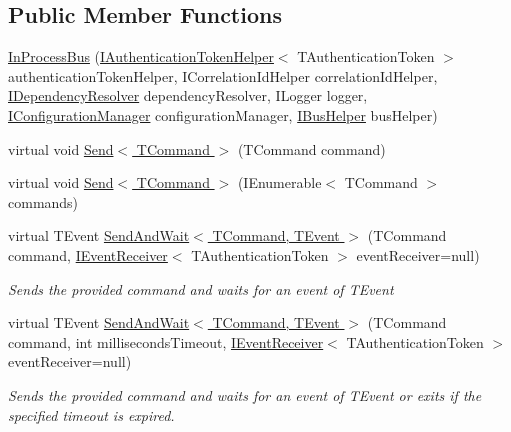 \subsection*{Public Member Functions}
\begin{DoxyCompactItemize}
\item 
\hyperlink{classCqrs_1_1Bus_1_1InProcessBus_a64bea583461562783d97cd98ff0dff91_a64bea583461562783d97cd98ff0dff91}{In\+Process\+Bus} (\hyperlink{interfaceCqrs_1_1Authentication_1_1IAuthenticationTokenHelper}{I\+Authentication\+Token\+Helper}$<$ T\+Authentication\+Token $>$ authentication\+Token\+Helper, I\+Correlation\+Id\+Helper correlation\+Id\+Helper, \hyperlink{interfaceCqrs_1_1Configuration_1_1IDependencyResolver}{I\+Dependency\+Resolver} dependency\+Resolver, I\+Logger logger, \hyperlink{interfaceCqrs_1_1Configuration_1_1IConfigurationManager}{I\+Configuration\+Manager} configuration\+Manager, \hyperlink{interfaceCqrs_1_1Bus_1_1IBusHelper}{I\+Bus\+Helper} bus\+Helper)
\item 
virtual void \hyperlink{classCqrs_1_1Bus_1_1InProcessBus_a6a074ef3663d2855875307b106fe4416_a6a074ef3663d2855875307b106fe4416}{Send$<$ T\+Command $>$} (T\+Command command)
\item 
virtual void \hyperlink{classCqrs_1_1Bus_1_1InProcessBus_ae5dae5f2445387280c974ec181167055_ae5dae5f2445387280c974ec181167055}{Send$<$ T\+Command $>$} (I\+Enumerable$<$ T\+Command $>$ commands)
\item 
virtual T\+Event \hyperlink{classCqrs_1_1Bus_1_1InProcessBus_a506d617dc7ec3838791a91e09b73b8ce_a506d617dc7ec3838791a91e09b73b8ce}{Send\+And\+Wait$<$ T\+Command, T\+Event $>$} (T\+Command command, \hyperlink{interfaceCqrs_1_1Events_1_1IEventReceiver}{I\+Event\+Receiver}$<$ T\+Authentication\+Token $>$ event\+Receiver=null)
\begin{DoxyCompactList}\small\item\em Sends the provided {\itshape command}  and waits for an event of {\itshape T\+Event}  \end{DoxyCompactList}\item 
virtual T\+Event \hyperlink{classCqrs_1_1Bus_1_1InProcessBus_a1b3540fe06b60cd601eaff4ea53f5465_a1b3540fe06b60cd601eaff4ea53f5465}{Send\+And\+Wait$<$ T\+Command, T\+Event $>$} (T\+Command command, int milliseconds\+Timeout, \hyperlink{interfaceCqrs_1_1Events_1_1IEventReceiver}{I\+Event\+Receiver}$<$ T\+Authentication\+Token $>$ event\+Receiver=null)
\begin{DoxyCompactList}\small\item\em Sends the provided {\itshape command}  and waits for an event of {\itshape T\+Event}  or exits if the specified timeout is expired. \end{DoxyCompactList}\item 

\end{DoxyCompactItemize}
